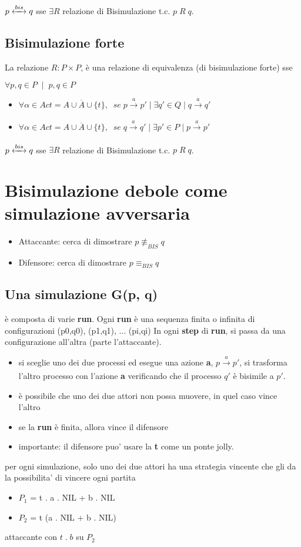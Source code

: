 $p \xleftrightarrow[]{bis} q$ sse $\exists R$ relazione di Bisimulazione t.c. $p \; R \; q$.

\subsection{Bisimulazione forte}

La relazione $R : P \times P$,  \`e una relazione di equivalenza (di bisimulazione forte) sse

$\forall p,q \in P \;\; | \;\; p,q \in P$ 

\begin{itemize}
  \item $\forall \alpha \in Act = A \cup \overline A \cup \{t\}, \;\; se \; p \xrightarrow[]{a} p' \; | \; \exists q' \in Q \; | \; q \xrightarrow[]{a} q'$
  \item $\forall \alpha \in Act = A \cup \overline A \cup \{t\}, \;\; se \; q \xrightarrow[]{a} q' \; | \; \exists p' \in P \; | \; p \xrightarrow[]{a} p'$
\end{itemize}

$p \xleftrightarrow[]{bis} q$ sse $\exists R$ relazione di Bisimulazione t.c. $p \; R \; q$.

\section{Bisimulazione debole come simulazione avversaria}

\begin{itemize}
  \item Attaccante: cerca di dimostrare $p \not \equiv_{BIS} q$
  \item Difensore: cerca di dimostrare $p \equiv_{BIS} q$
\end{itemize}

\subsection{Una simulazione G(p, q)}

\`e composta di varie \textbf{run}. Ogni \textbf{run} \`e una sequenza finita o infinita di configurazioni (p0,q0), (p1,q1), ... (pi,qi)
In ogni \textbf{step} di \textbf{run}, si passa da una configurazione all'altra (parte l'attaccante).

\begin{itemize}
  \item si sceglie uno dei due processi ed esegue una azione \textbf{a}, $p \xrightarrow[]{a} p'$, si trasforma l'altro processo con l'azione \textbf{a} verificando che il processo $q'$ \`e bisimile a $p'$.
  \item \`e possibile che uno dei due attori non possa muovere, in quel caso vince l'altro
  \item se la \textbf{run} \`e finita, allora vince il difensore
  \item importante: il difensore puo' usare la \textbf{t} come un ponte jolly.
\end{itemize}

per ogni simulazione, solo uno dei due attori ha una strategia vincente che gli da la possibilita' di vincere ogni partita

\begin{itemize}
  \item $P_1$ = t . a . NIL + b . NIL
  \item $P_2$ = t (a . NIL + b . NIL)
\end{itemize}

attaccante con $ t \; . \; b$ su $P_2$

